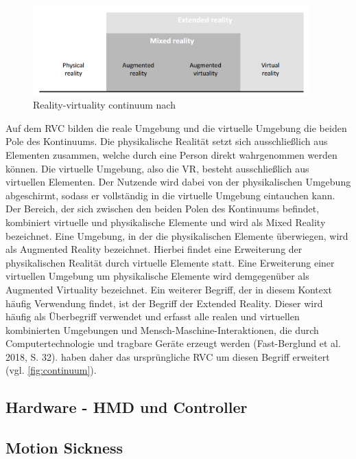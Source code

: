 \begin{figure}[tbh]
 \centering
\includegraphics[width=0.95\textwidth]{images/Mixed-Reality-Cont-NEW.png}
 \caption{Reality-virtuality continuum nach \cite{wohlgenannt_virtual_2020}}
 \label{fig:continuum}
\end{figure}

Auf dem RVC bilden die reale Umgebung und die virtuelle
Umgebung die beiden Pole des Kontinuums. Die physikalische Realität setzt sich ausschließlich aus Elementen zusammen, welche durch eine Person direkt wahrgenommen werden können. Die virtuelle Umgebung, also die VR, besteht ausschließlich aus virtuellen Elementen. Der Nutzende wird dabei von der physikalischen Umgebung abgeschirmt, sodass er vollständig in die virtuelle Umgebung eintauchen kann. Der Bereich, der sich zwischen den beiden Polen des Kontinuums befindet, kombiniert virtuelle und physikalische Elemente und wird als Mixed Reality bezeichnet. Eine Umgebung, in der die physikalischen Elemente überwiegen, wird als Augmented Reality bezeichnet. Hierbei findet eine Erweiterung der physikalischen Realität durch virtuelle Elemente statt. Eine Erweiterung einer virtuellen Umgebung um physikalische Elemente wird demgegenüber als Augmented Virtuality bezeichnet. 
Ein weiterer Begriff, der in diesem Kontext häufig Verwendung findet, ist der Begriff der Extended Reality. Dieser wird häufig als Überbegriff verwendet und erfasst alle realen und virtuellen kombinierten Umgebungen und Mensch-Maschine-Interaktionen, die durch Computertechnologie und tragbare Geräte erzeugt werden (Fast-Berglund et al. 2018, S. 32). \citet{wohlgenannt_virtual_2020} haben daher das ursprüngliche RVC um diesen Begriff erweitert (vgl. \autoref{fig:continuum}). 
 
\subsection{Hardware - HMD und Controller}

\subsection{Motion Sickness}

